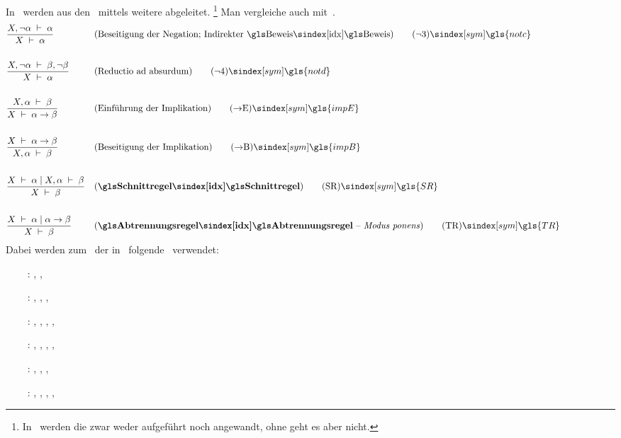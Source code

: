 {In~\cite{bib:Rautenberg} werden aus den \Basisregeln\ mittels  weitere  abgeleitet.%
\footnote{%
	In~\cite{bib:Rautenberg} werden die  zwar weder aufgeführt noch angewandt, ohne  geht es aber nicht.
}
Man vergleiche auch mit~\cite{bib:NatuerlichesSchliessen}.
%
\begin{align}
	& \frac{X,\lnot\alpha\derive\alpha}{X\derive\alpha}
	& & (\text{Beseitigung der Negation; Indirekter \Beweis})
	\tag{\tagnotc} \sym{\gls{notc}} \label{def:notc}
	\\\\
	& \frac{X,\lnot\alpha\derive\beta,\lnot\beta}{X\derive\alpha}
	& & (\text{Reductio ad absurdum})
	\tag{\tagnotd} \sym{\gls{notd}} \label{def:notd}
	\\\\
	& \frac{X,\alpha\derive\beta}{X\derive\alpha\limp\beta}
	& & (\text{Einführung der Implikation})
	\tag{\tagimpE} \sym{\gls{impE}} \label{def:impE}
	\\\\
	& \frac{X\derive\alpha\limp\beta}{X,\alpha\derive\beta}
	& & (\text{Beseitigung der Implikation})
	\tag{\tagimpB} \sym{\gls{impB}} \label{def:impB}
	\\\\
	& \frac{X\derive\alpha \srand X,\alpha\derive\beta}{X\derive\beta}
	& & (\text{\defn{\glsIdx{Schnittregel}}})
	\tag{\tagSR} \sym{\gls{SR}} \label{def:SR}
	\\\\
	& \frac{X\derive\alpha \srand \alpha\limp\beta}{X\derive\beta}
	& & (\text{\defn{\Abtrennungsregel} -- \emph{Modus ponens}})
	\tag{\tagTR} \sym{\gls{TR}} \label{def:TR}
	\formulatoleft
\end{align}
%
Dabei werden zum \Beweis\ der  in~\cite{bib:Rautenberg} folgende \Basisregeln\ verwendet:
\begin{itemize}
	\renewcommand*{\itemindent}{1cm}
	\renewcommand*{\labelsep}{5pt}
	\item[\tagnotc~:] \tagAR, \tagMR,           \tagnotb
	\item[\tagnotd~:] \tagAR, \tagMR, \tagnota, \tagnotb
	\item[\tagimpE~:] \tagAR, \tagMR, \tagnota, \tagnotb, \tagandE
	\item[\tagimpB~:] \tagAR, \tagMR, \tagnota, \tagnotb          , \tagandB
	\item[\tagSR  ~:] \tagAR, \tagMR, \tagnota, \tagnotb
	\item[\tagTR  ~:] \tagAR, \tagMR, \tagnota, \tagnotb, \tagandE
\end{itemize}
%
}
